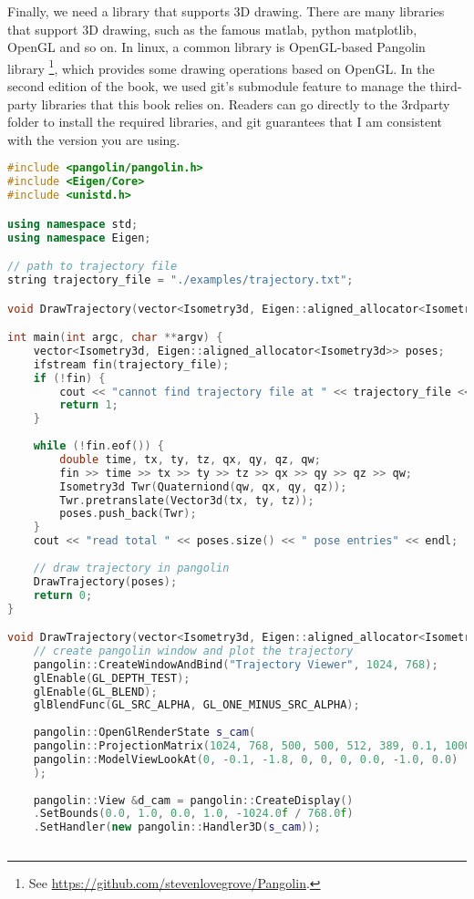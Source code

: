 Finally, we need a library that supports 3D drawing. There are many libraries that support 3D drawing, such as the famous matlab, python matplotlib, OpenGL and so on. In linux, a common library is OpenGL-based Pangolin library \footnote{See \url {https://github.com/stevenlovegrove/Pangolin}.}, which provides some drawing operations based on OpenGL. In the second edition of the book, we used git's submodule feature to manage the third-party libraries that this book relies on. Readers can go directly to the 3rdparty folder to install the required libraries, and git guarantees that I am consistent with the version you are using.

\begin{lstlisting}[language=c++,caption=slambook2/ch3/examples/plotTrajectory.cpp]
#include <pangolin/pangolin.h>
#include <Eigen/Core>
#include <unistd.h>

using namespace std;
using namespace Eigen;

// path to trajectory file
string trajectory_file = "./examples/trajectory.txt";

void DrawTrajectory(vector<Isometry3d, Eigen::aligned_allocator<Isometry3d>>);

int main(int argc, char **argv) {
	vector<Isometry3d, Eigen::aligned_allocator<Isometry3d>> poses;
	ifstream fin(trajectory_file);
	if (!fin) {
		cout << "cannot find trajectory file at " << trajectory_file << endl;
		return 1;
	}
	
	while (!fin.eof()) {
		double time, tx, ty, tz, qx, qy, qz, qw;
		fin >> time >> tx >> ty >> tz >> qx >> qy >> qz >> qw;
		Isometry3d Twr(Quaterniond(qw, qx, qy, qz));
		Twr.pretranslate(Vector3d(tx, ty, tz));
		poses.push_back(Twr);
	}
	cout << "read total " << poses.size() << " pose entries" << endl;
	
	// draw trajectory in pangolin
	DrawTrajectory(poses);
	return 0;
}

void DrawTrajectory(vector<Isometry3d, Eigen::aligned_allocator<Isometry3d>> poses) {
	// create pangolin window and plot the trajectory
	pangolin::CreateWindowAndBind("Trajectory Viewer", 1024, 768);
	glEnable(GL_DEPTH_TEST);
	glEnable(GL_BLEND);
	glBlendFunc(GL_SRC_ALPHA, GL_ONE_MINUS_SRC_ALPHA);
	
	pangolin::OpenGlRenderState s_cam(
	pangolin::ProjectionMatrix(1024, 768, 500, 500, 512, 389, 0.1, 1000),
	pangolin::ModelViewLookAt(0, -0.1, -1.8, 0, 0, 0, 0.0, -1.0, 0.0)
	);
	
	pangolin::View &d_cam = pangolin::CreateDisplay()
	.SetBounds(0.0, 1.0, 0.0, 1.0, -1024.0f / 768.0f)
	.SetHandler(new pangolin::Handler3D(s_cam));
	

\end{lstlisting}
